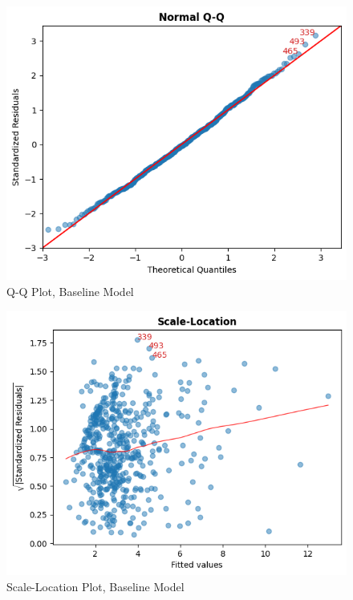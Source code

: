 \documentclass[10pt]{article}
\begin{document}
\begin{figure}[H]
\centering
	\centerline{\includegraphics[width=\columnwidth]{baseline_qq}}
	\caption{Q-Q Plot, Baseline Model\label{baseline_qq}}
\end{figure}

\begin{figure}[H]
\centering
	\centerline{\includegraphics[width=\columnwidth]{baseline_scale_location}}
	\caption{Scale-Location Plot, Baseline Model\label{baseline_scale_location}}
\end{figure}
\end{document}
